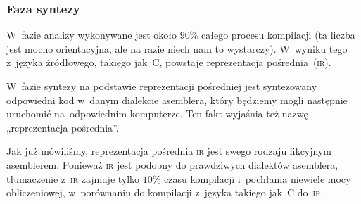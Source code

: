 \documentclass[10pt,t]{beamer}
\begin{document}
\begin{frame}
  \frametitle{Faza syntezy}


  W~fazie analizy wykonywane jest około $90\%$ całego procesu kompilacji
  (ta liczba jest mocno orientacyjna, ale na razie niech nam to wystarczy).
  W~wyniku tego z~języka źródłowego, takiego jak~C, powstaje reprezentacja
  pośrednia~(\textsc{ir}).

  W~fazie syntezy na podstawie reprezentacji pośredniej jest
  \alert{syntezowany} odpowiedni kod w~danym dialekcie asemblera,
  który będziemy mogli następnie uruchomić na~odpowiednim komputerze.
  Ten fakt wyjaśnia też nazwę „reprezentacja pośrednia”.

  Jak już mówiliśmy, reprezentacja pośrednia \textsc{ir} jest swego rodzaju
  fikcyjnym asemblerem. Ponieważ \textsc{ir} jest podobny do prawdziwych
  dialektów asemblera, tłumaczenie z~\textsc{ir} zajmuje tylko $10\%$
  czasu kompilacji i~pochłania niewiele mocy obliczeniowej, w~porównaniu do
  kompilacji z~języka takiego jak~C do~\textsc{ir}.

\end{frame}



















\end{document}
